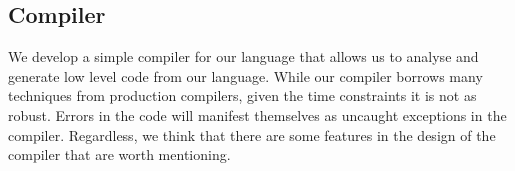 \subsection{Compiler}

We develop a simple compiler for our language that allows us to 	
	analyse and generate low level code from our language.
While our compiler borrows many techniques from production compilers,
	given the time constraints it is not as robust.
Errors in the code will manifest themselves as uncaught exceptions
	in the compiler.
Regardless, we think that there are some features in the design of
	the compiler that are worth mentioning. 






